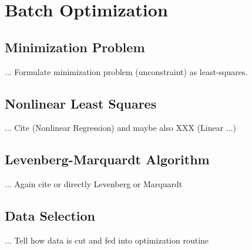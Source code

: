 \chapter{Batch Optimization}
\label{chap:batch}

\section{Minimization Problem}
... Formulate minimization problem (unconstraint) as least-squares.

\section{Nonlinear Least Squares}
... Cite \cite{Seber} (Nonlinear Regression) and maybe also XXX (Linear ...)

\section{Levenberg-Marquardt Algorithm}
... Again cite \cite{Seber} or directly Levenberg or Marquardt

\section{Data Selection}
... Tell how data is cut and fed into optimization routine